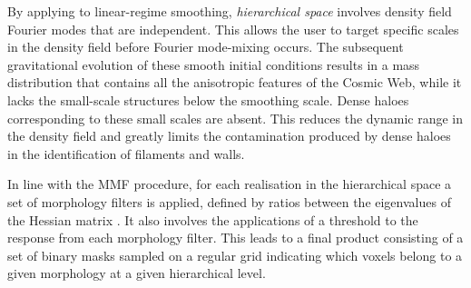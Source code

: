 By applying to linear-regime smoothing, \textit{hierarchical space} involves density field Fourier modes that are independent. This 
allows the user to target specific scales in the density field before Fourier mode-mixing occurs. The subsequent gravitational 
evolution of these smooth initial conditions results in a mass distribution that contains all the anisotropic features of the Cosmic Web, 
while it lacks the small-scale structures below the smoothing scale. Dense haloes corresponding to these small scales are absent. This reduces the 
dynamic range in the density field and greatly limits the contamination produced by dense haloes in the identification of filaments 
and walls. 

In line with the MMF procedure, for each realisation in the hierarchical space a set of 
morphology filters is applied, defined by ratios between the eigenvalues of the Hessian matrix 
\citep[$\lambda_1 < \lambda_2 < \lambda_3$, see][]{aragon2007}.  It also involves the applications of a threshold to the response from 
each morphology filter. This leads to a  final product consisting of a set of binary masks sampled on a regular grid indicating 
which voxels belong to a given morphology at a given hierarchical level. 

